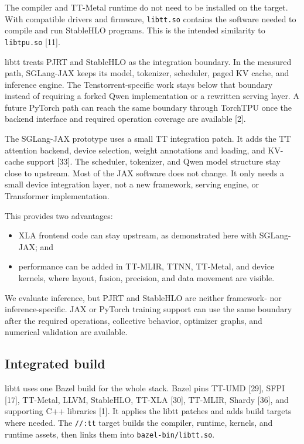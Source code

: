 \documentclass[
  10pt,
  american,
  10pt,
  letterpaper]{article}
\providecommand{\tightlist}{%
  \setlength{\itemsep}{0pt}\setlength{\parskip}{0pt}}
\begin{document}
The compiler and TT-Metal runtime do not need to be installed on the
target. With compatible drivers and firmware, \texttt{libtt.so} contains
the software needed to compile and run StableHLO programs. This is the
intended similarity to \texttt{libtpu.so} {[}11{]}.

libtt treats PJRT and StableHLO as the integration boundary. In the
measured path, SGLang-JAX keeps its model, tokenizer, scheduler, paged
KV cache, and inference engine. The Tenstorrent-specific work stays
below that boundary instead of requiring a forked Qwen implementation or
a rewritten serving layer. A future PyTorch path can reach the same
boundary through TorchTPU once the backend interface and required
operation coverage are available {[}2{]}.

The SGLang-JAX prototype uses a small TT integration patch. It adds the
TT attention backend, device selection, weight annotations and loading,
and KV-cache support {[}33{]}. The scheduler, tokenizer, and Qwen model
structure stay close to upstream. Most of the JAX software does not
change. It only needs a small device integration layer, not a new
framework, serving engine, or Transformer implementation.

This provides two advantages:

\begin{itemize}
\tightlist
\item
  XLA frontend code can stay upstream, as demonstrated here with
  SGLang-JAX; and
\item
  performance can be added in TT-MLIR, TTNN, TT-Metal, and device
  kernels, where layout, fusion, precision, and data movement are
  visible.
\end{itemize}

We evaluate inference, but PJRT and StableHLO are neither framework- nor
inference-specific. JAX or PyTorch training support can use the same
boundary after the required operations, collective behavior, optimizer
graphs, and numerical validation are available.

\hypertarget{integrated-build}{%
\subsection{Integrated build}\label{integrated-build}}

libtt uses one Bazel build for the whole stack. Bazel pins TT-UMD
{[}29{]}, SFPI {[}17{]}, TT-Metal, LLVM, StableHLO, TT-XLA {[}30{]},
TT-MLIR, Shardy {[}36{]}, and supporting C++ libraries {[}1{]}. It
applies the libtt patches and adds build targets where needed. The
\texttt{//:tt} target builds the compiler, runtime, kernels, and runtime
assets, then links them into \texttt{bazel-bin/libtt.so}.
\end{document}
